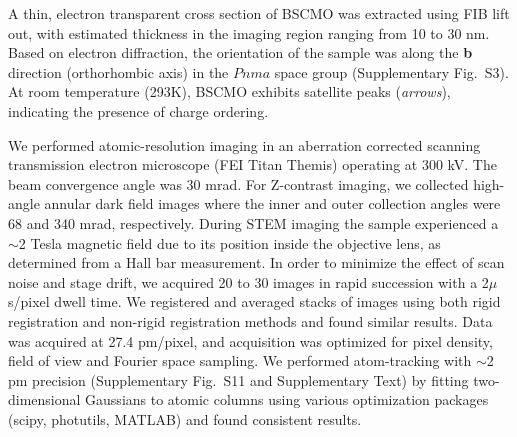 \documentclass[12pt]{article}
\begin{document}
A thin, electron transparent cross section of BSCMO was extracted using FIB lift out, with estimated thickness in the imaging region ranging from 10 to 30 nm.
Based on electron diffraction, the orientation of the sample was along the \textbf{b} direction (orthorhombic axis) in the $Pnma$ space group (Supplementary Fig.~S3).
At room temperature (293K), BSCMO exhibits satellite peaks (\textit{arrows}), indicating the presence of charge ordering.

We performed atomic-resolution imaging in an aberration corrected scanning transmission electron microscope (FEI Titan Themis) operating at 300 kV. 
The beam convergence angle was 30 mrad. 
For Z-contrast imaging, we collected high-angle annular dark field images where the inner and outer collection angles were 68 and 340 mrad, respectively.
During STEM imaging the sample experienced a $\sim$2 Tesla magnetic field due to its position inside the objective lens, as determined from a Hall bar measurement. 
In order to minimize the effect of scan noise and stage drift, we acquired 20 to 30 images in rapid succession with a 2$\mu$s/pixel dwell time.
We registered and averaged stacks of images using both rigid registration and non-rigid registration methods and found similar results.
Data was acquired at 27.4 pm/pixel, and acquisition was optimized for pixel density, field of view and Fourier space sampling.
We performed atom-tracking with $\sim$2 pm precision (Supplementary Fig.~S11 and Supplementary Text) by fitting two-dimensional Gaussians to atomic columns using various optimization packages (scipy, photutils, MATLAB) and found consistent results. 





\clearpage


\end{document}

